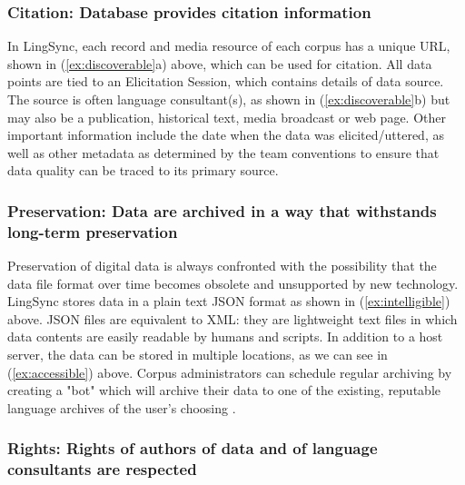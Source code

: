 \documentclass[letterpaper, 12pt, dvips]{mitwpl}
\begin{document}
\subsubsection{\textbf{Citation}: Database provides citation information} 
 
In LingSync, each record  and media resource of each corpus has a unique URL, shown in (\ref{ex:discoverable}a) above, which can be used for citation. 
All data points are tied to an Elicitation Session, which contains details of data source. The source is often language consultant(s), as shown in (\ref{ex:discoverable}b) but may also be a publication, historical text, media broadcast or web page. Other important information include the date when the data was elicited/uttered, as well as other metadata as determined by the team conventions to ensure that data quality can be traced to its primary source. 

\subsubsection{\textbf{Preservation}: Data are archived in a way that withstands long-term preservation}

Preservation of digital data is always confronted with the possibility that the data file format over time becomes obsolete and unsupported by new technology. LingSync stores data in a plain text JSON format  as shown in (\ref{ex:intelligible}) above. 
JSON files  are equivalent to XML: they are lightweight text files in which data contents are easily readable by humans and scripts. In addition to a host server, the data can be stored in multiple locations, as we can see in  (\ref{ex:accessible}) above. 
Corpus administrators  can schedule regular archiving by creating a "bot" which will archive their data to one of the existing, reputable language archives of the user's choosing \citep{EMELD:2006:Archives}.


\subsubsection{\textbf{Rights}: Rights of authors of data and of language consultants are respected}
\end{document}
